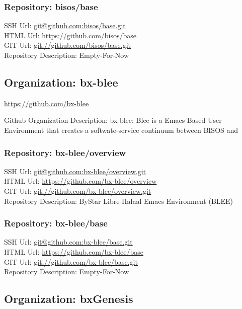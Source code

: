 \subsubsection{Repository: bisos/base}

SSH Url:  \url{git@github.com:bisos/base.git}\\
HTML Url: \url{https://github.com/bisos/base}\\
GIT Url:  \url{git://github.com/bisos/base.git}\\


Repository Description: Empty-For-Now

\subsection{Organization: bx-blee}

\url{https://github.com/bx-blee}

Github Organization Description:  bx-blee: Blee is a Emacs Based User Environment that creates a softwate-service continuum between BISOS and 

\subsubsection{Repository: bx-blee/overview}

SSH Url:  \url{git@github.com:bx-blee/overview.git}\\
HTML Url: \url{https://github.com/bx-blee/overview}\\
GIT Url:  \url{git://github.com/bx-blee/overview.git}\\


Repository Description: ByStar Libre-Halaal Emacs Environment (BLEE)

\subsubsection{Repository: bx-blee/base}

SSH Url:  \url{git@github.com:bx-blee/base.git}\\
HTML Url: \url{https://github.com/bx-blee/base}\\
GIT Url:  \url{git://github.com/bx-blee/base.git}\\


Repository Description: Empty-For-Now

\subsection{Organization: bxGenesis}

